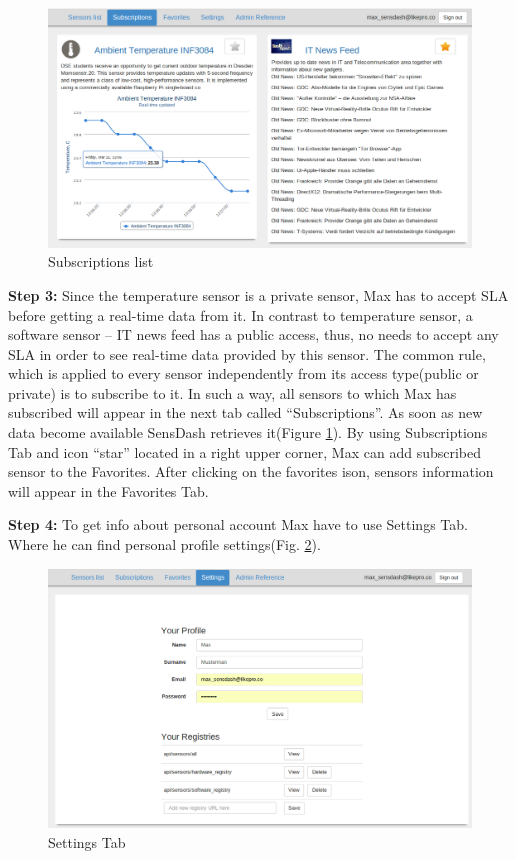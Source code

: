 \begin{figure}[!ht]
\centering
\includegraphics[scale=0.6]{Screenshots/UseCaseScreenshot4.png}   
\caption[Personal Subscribed Sensor]{Subscriptions list} 
\label{img:subscriptions}                        
\end{figure}
\textbf{Step 3:} Since the temperature sensor is a private sensor, Max has to accept SLA before getting a real-time data from it. In contrast to temperature sensor, a software sensor -- IT news feed has a public access, thus, no needs to accept any SLA in order to see real-time data provided by this sensor. The common rule, which is applied to every sensor independently from its access type(public or private) is to subscribe to it. In such a way, all sensors to which Max has subscribed will appear in the next tab called ``Subscriptions''. As soon as new data become available SensDash retrieves it(Figure \ref{img:subscriptions}). By using Subscriptions Tab and icon ``star'' located in a right upper corner, Max can add subscribed sensor to the Favorites. After clicking on the favorites ison, sensors information will appear in the Favorites Tab.

\textbf{Step 4:} To get info about personal account Max have to use Settings Tab. Where he can find personal profile settings(Fig. \ref{img:settings}). 
\begin{figure}[!ht]
\centering
\includegraphics[scale=0.6]{Screenshots/UseCaseScreenshot6.png}   
\caption[Settings Tab]{Settings Tab}
\label{img:settings}                         
\end{figure}

